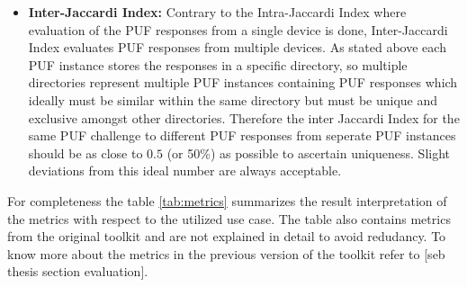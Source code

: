 \begin{itemize}
	\item \textbf{Inter-Jaccardi Index:} Contrary to the Intra-Jaccardi Index where evaluation of the PUF responses from a single device is done, Inter-Jaccardi Index evaluates PUF responses from multiple devices. As stated above each PUF instance stores the responses in a specific directory, so multiple directories represent multiple PUF instances containing PUF responses which ideally must be similar within the same directory but must be unique and exclusive amongst other directories.
		Therefore the inter Jaccardi Index for the same PUF challenge to different PUF responses from
		seperate PUF instances should be as close to $0.5$ (or 50\%) as possible to ascertain
		uniqueness. Slight deviations from this ideal number are always acceptable.
\end{itemize}

For completeness the table \ref{tab:metrics} summarizes the result interpretation of the metrics with respect to the utilized use case. The table also contains metrics from the original toolkit and are not explained in detail to avoid redudancy. To know more about the metrics in the previous version of the toolkit refer to [seb thesis section evaluation].\\

